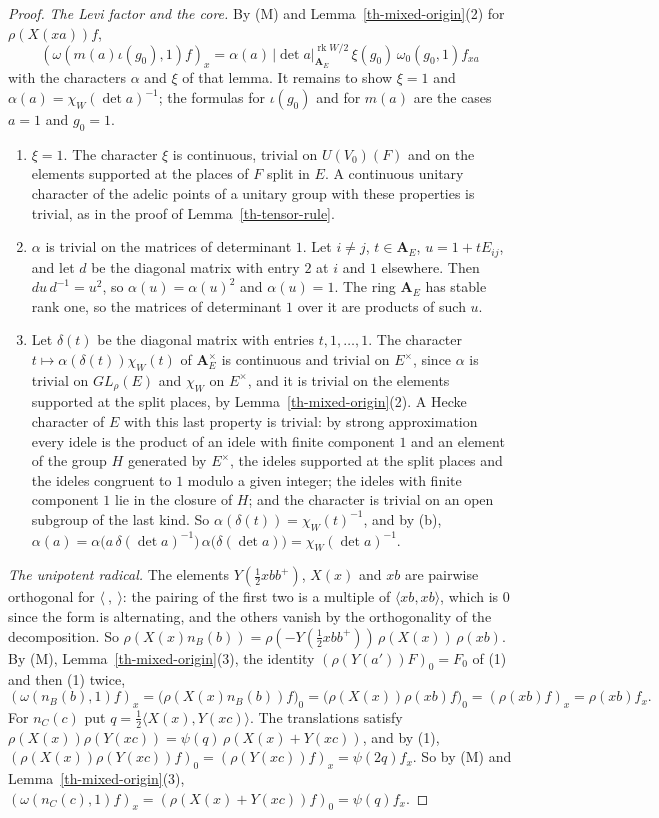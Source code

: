 \begin{proof}
\emph{The Levi factor and the core.} By (M) and
Lemma~\ref{th-mixed-origin}(2) for $\rho(X(xa))f$,
\[
(\omega(m(a)\iota(g_0),1)f)_x=\alpha(a)\,|\det a|_{\mathbf A_E}^{\operatorname{rk}W/2}\,\xi(g_0)\,\omega_0(g_0,1)f_{xa}
\]
with the characters $\alpha$ and $\xi$ of that lemma. It remains to show
$\xi=1$ and $\alpha(a)=\chi_W(\det a)^{-1}$; the formulas for $\iota(g_0)$ and
for $m(a)$ are the cases $a=1$ and $g_0=1$.
\begin{enumerate}
\item[(a)] $\xi=1$. The character $\xi$ is continuous, trivial on $U(V_0)(F)$
  and on the elements supported at the places of $F$ split in $E$. A
  continuous unitary character of the adelic points of a unitary group with
  these properties is trivial, as in the proof of
  Lemma~\ref{th-tensor-rule}.
\item[(b)] $\alpha$ is trivial on the matrices of determinant $1$. Let
  $i\neq j$, $t\in\mathbf A_E$, $u=1+tE_{ij}$, and let $d$ be the diagonal
  matrix with entry $2$ at $i$ and $1$ elsewhere. Then $du\,d^{-1}=u^2$, so
  $\alpha(u)=\alpha(u)^2$ and $\alpha(u)=1$. The ring $\mathbf A_E$ has stable
  rank one, so the matrices of determinant $1$ over it are products of such
  $u$.
\item[(c)] Let $\delta(t)$ be the diagonal matrix with entries
  $t,1,\ldots,1$. The character $t\mapsto\alpha(\delta(t))\chi_W(t)$ of
  $\mathbf A_E^\times$ is continuous and trivial on $E^\times$, since $\alpha$
  is trivial on $GL_\rho(E)$ and $\chi_W$ on $E^\times$, and it is trivial on
  the elements supported at the split places, by
  Lemma~\ref{th-mixed-origin}(2). A Hecke character of $E$ with this last
  property is trivial: by strong approximation every idele is the product of
  an idele with finite component $1$ and an element of the group $H$
  generated by $E^\times$, the ideles supported at the split places and the
  ideles congruent to $1$ modulo a given integer; the ideles with finite
  component $1$ lie in the closure of $H$; and the character is trivial on an
  open subgroup of the last kind. So $\alpha(\delta(t))=\chi_W(t)^{-1}$, and by
  (b), $\alpha(a)=\alpha\bigl(a\,\delta(\det a)^{-1}\bigr)\,\alpha\bigl(\delta(\det a)\bigr)=\chi_W(\det a)^{-1}$.
\end{enumerate}

\emph{The unipotent radical.} The elements $Y(\tfrac12xbb^+)$, $X(x)$ and $xb$
are pairwise orthogonal for $\langle\ ,\ \rangle$: the pairing of the first two
is a multiple of $\langle xb,xb\rangle$, which is $0$ since the form is
alternating, and the others vanish by the orthogonality of the decomposition. So
$\rho(X(x)n_B(b))=\rho(-Y(\tfrac12xbb^+))\,\rho(X(x))\,\rho(xb)$. By (M),
Lemma~\ref{th-mixed-origin}(3), the identity $(\rho(Y(a'))F)_0=F_0$ of (1) and
then (1) twice,
\[
(\omega(n_B(b),1)f)_x=\bigl(\rho(X(x)n_B(b))f\bigr)_0
=\bigl(\rho(X(x))\rho(xb)f\bigr)_0=(\rho(xb)f)_x=\rho(xb)f_x .
\]
For $n_C(c)$ put $q=\tfrac12\langle X(x),Y(xc)\rangle$. The translations
satisfy $\rho(X(x))\rho(Y(xc))=\psi(q)\,\rho(X(x)+Y(xc))$, and by (1),
$(\rho(X(x))\rho(Y(xc))f)_0=(\rho(Y(xc))f)_x=\psi(2q)f_x$. So by (M) and
Lemma~\ref{th-mixed-origin}(3),
$(\omega(n_C(c),1)f)_x=(\rho(X(x)+Y(xc))f)_0=\psi(q)f_x$.
\end{proof}


